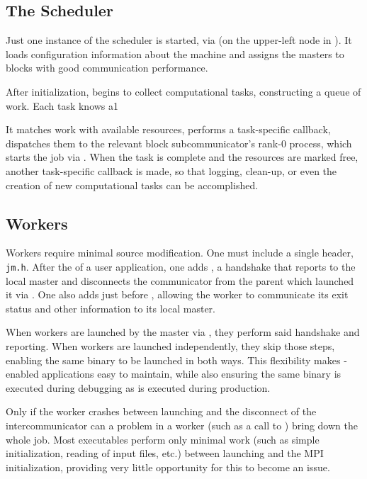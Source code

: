 \subsection{The Scheduler}

Just one instance of the scheduler is started, via \spawn (on the upper-left node in ).
It loads configuration information about the machine and assigns the masters to blocks with good communication performance.

After initialization, \jmscheduler begins to collect computational tasks, constructing a queue of work.
Each task knows a1

It matches work with available resources, performs a task-specific callback, dispatches them to the relevant block subcommunicator's rank-0 process, which starts the job via \spawn.
When the task is complete and the resources are marked free, another task-specific callback is made, so that logging, clean-up, or even the creation of new computational tasks can be accomplished.


\subsection{Workers}

Workers require minimal source modification.
One must include a single header, \texttt{jm.h}.
After the \mpiinit of a user application, one adds \jmhandshake, a handshake that reports to the local master and disconnects the communicator from the parent which launched it via \spawn.
One also adds \jmfinish just before \mpifinalize, allowing the worker to communicate its exit status and other information to its local master.

When workers are launched by the master via \spawn, they perform said handshake and reporting.
When workers are launched independently, they skip those steps, enabling the same binary to be launched in both ways.
This flexibility makes \mpijm-enabled applications easy to maintain, while also ensuring the same binary is executed during debugging as is executed during production.

Only if the worker crashes between launching and the disconnect of the intercommunicator can a problem in a worker (such as a call to \mpiabort) bring down the whole job.
Most executables perform only minimal work (such as simple initialization, reading of input files, etc.) between launching and the MPI initialization, providing very little opportunity for this to become an issue.
 

